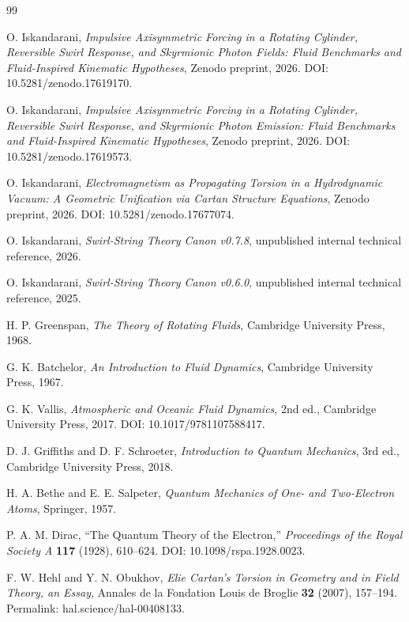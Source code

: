 \documentclass[11pt,a4paper]{article}
\begin{document}
\begin{thebibliography}{99}

O. Iskandarani,
\textit{Impulsive Axisymmetric Forcing in a Rotating Cylinder, Reversible Swirl Response, and Skyrmionic Photon Fields: Fluid Benchmarks and Fluid-Inspired Kinematic Hypotheses},
Zenodo preprint, 2026.
DOI: 10.5281/zenodo.17619170.

O. Iskandarani,
\textit{Impulsive Axisymmetric Forcing in a Rotating Cylinder, Reversible Swirl Response, and Skyrmionic Photon Emission: Fluid Benchmarks and Fluid-Inspired Kinematic Hypotheses},
Zenodo preprint, 2026.
DOI: 10.5281/zenodo.17619573.

O. Iskandarani,
\textit{Electromagnetism as Propagating Torsion in a Hydrodynamic Vacuum: A Geometric Unification via Cartan Structure Equations},
Zenodo preprint, 2026.
DOI: 10.5281/zenodo.17677074.

O. Iskandarani,
\textit{Swirl-String Theory Canon v0.7.8},
unpublished internal technical reference, 2026.

O. Iskandarani,
\textit{Swirl-String Theory Canon v0.6.0},
unpublished internal technical reference, 2025.

H. P. Greenspan,
\textit{The Theory of Rotating Fluids},
Cambridge University Press, 1968.

G. K. Batchelor,
\textit{An Introduction to Fluid Dynamics},
Cambridge University Press, 1967.

G. K. Vallis,
\textit{Atmospheric and Oceanic Fluid Dynamics},
2nd ed., Cambridge University Press, 2017.
DOI: 10.1017/9781107588417.

D. J. Griffiths and D. F. Schroeter,
\textit{Introduction to Quantum Mechanics},
3rd ed., Cambridge University Press, 2018.

H. A. Bethe and E. E. Salpeter,
\textit{Quantum Mechanics of One- and Two-Electron Atoms},
Springer, 1957.

P. A. M. Dirac,
``The Quantum Theory of the Electron,''
\textit{Proceedings of the Royal Society A} \textbf{117} (1928), 610--624.
DOI: 10.1098/rspa.1928.0023.

F. W. Hehl and Y. N. Obukhov,
\textit{Elie Cartan's Torsion in Geometry and in Field Theory, an Essay},
Annales de la Fondation Louis de Broglie \textbf{32} (2007), 157--194.
Permalink: hal.science/hal-00408133.

\end{thebibliography}
\end{document}
